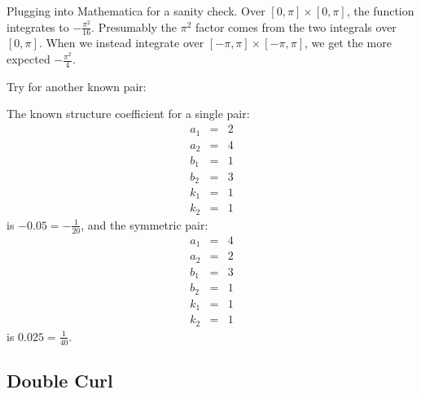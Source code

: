 \documentclass[12pt,onecolumn]{article}
\begin{document}
Plugging into Mathematica for a sanity check. Over $[0,\pi] \times [0, \pi]$, the function integrates to $-\frac{\pi^2}{16}$. Presumably the $\pi^2$ factor comes from the two integrals over $[0,\pi]$. When we instead integrate over $[-\pi, \pi] \times [-\pi, \pi]$, we get the more expected $-\frac{\pi^2}{4}$.

Try for another known pair:

The known structure coefficient for a single pair:
\begin{eqnarray}
a_1 &=& 2 \\
a_2 &=& 4 \\
b_1 &=& 1 \\
b_2 &=& 3 \\
k_1 &=& 1 \\
k_2 &=& 1
\end{eqnarray}
is $-0.05 = -\frac{1}{20}$, and the symmetric pair:
\begin{eqnarray}
a_1 &=& 4 \\
a_2 &=& 2 \\
b_1 &=& 3 \\
b_2 &=& 1 \\
k_1 &=& 1 \\
k_2 &=& 1
\end{eqnarray}
is $0.025 = \frac{1}{40}$.

\newpage
\subsection{Double Curl}
\end{document}
